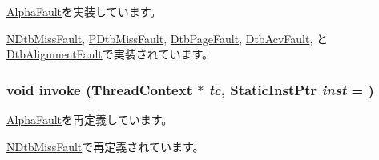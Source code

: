 \hyperlink{classAlphaISA_1_1AlphaFault_a5d92ccd11b5cd6b04f02bd0a088b776c}{AlphaFault}を実装しています。

\hyperlink{classAlphaISA_1_1NDtbMissFault_a6c79663c761ff57265459f7e3aefaf4c}{NDtbMissFault}, \hyperlink{classAlphaISA_1_1PDtbMissFault_a6c79663c761ff57265459f7e3aefaf4c}{PDtbMissFault}, \hyperlink{classAlphaISA_1_1DtbPageFault_a6c79663c761ff57265459f7e3aefaf4c}{DtbPageFault}, \hyperlink{classAlphaISA_1_1DtbAcvFault_a6c79663c761ff57265459f7e3aefaf4c}{DtbAcvFault}, と \hyperlink{classAlphaISA_1_1DtbAlignmentFault_a6c79663c761ff57265459f7e3aefaf4c}{DtbAlignmentFault}で実装されています。\hypertarget{classAlphaISA_1_1DtbFault_a2bd783b42262278d41157d428e1f8d6f}{
\subsubsection[{invoke}]{\setlength{\rightskip}{0pt plus 5cm}void invoke ({\bf ThreadContext} $\ast$ {\em tc}, \/  {\bf StaticInstPtr} {\em inst} = {})}}
\label{classAlphaISA_1_1DtbFault_a2bd783b42262278d41157d428e1f8d6f}


\hyperlink{classAlphaISA_1_1AlphaFault_a2bd783b42262278d41157d428e1f8d6f}{AlphaFault}を再定義しています。

\hyperlink{classAlphaISA_1_1NDtbMissFault_a2bd783b42262278d41157d428e1f8d6f}{NDtbMissFault}で再定義されています。


